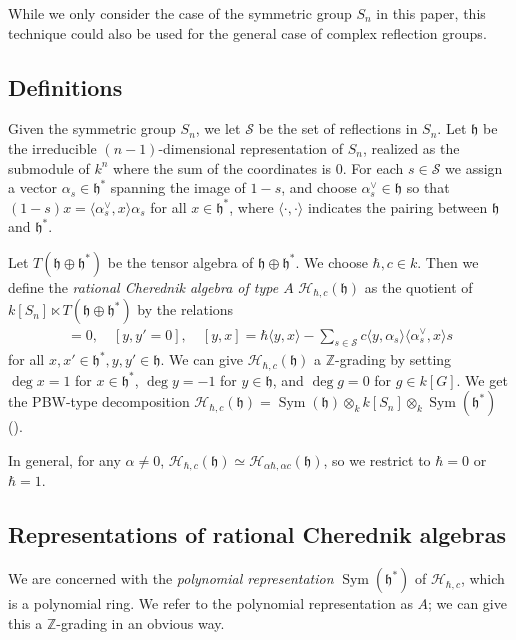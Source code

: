 \documentclass{amsart}
\numberwithin{equation}{section}
\theoremstyle{definition}
\newcommand{\h}{\mathfrak{h}}
\newcommand{\HH}{\mathcal{H}}
\newcommand{\Sym}{\operatorname{Sym}}
\begin{document}
While we only consider the case of the symmetric group $S_n$ in this paper, this technique could also be used for the general case of complex reflection groups. %


\subsection{Definitions}

Given the symmetric group $S_n$, we let $\mathcal{S}$ be the set of reflections in $S_n$. Let $\h$ be the irreducible $(n-1)$-dimensional representation of $S_n$, realized as the submodule of $k^n$ where the sum of the coordinates is $0$. For each $s \in \mathcal{S}$ we assign a vector $\alpha_s \in \h^*$ spanning the image of $1-s$, and choose $\alpha_s^\vee \in \h$ so that $(1-s)x=\langle \alpha_s^\vee,x\rangle \alpha_s$ for all $x \in \h^*$, where $\langle \cdot,\cdot\rangle$ indicates the pairing between $\h$ and $\h^*$. 

Let $T(\h \oplus \h^*)$ be the tensor algebra of $\h \oplus \h^*$. We choose $\hbar,c \in k$. Then we define the {\it rational Cherednik algebra of type $A$} $\HH_{\hbar,c}(\h)$ as the quotient of $k[S_n] \ltimes T(\h \oplus \h^*)$ by the relations
\begin{align*}
[x,x']=0, \quad [y,y' = 0], \quad [y,x] = \hbar\langle y,x\rangle - \sum_{s \in \mathcal{S}} c\langle y,\alpha_s\rangle\langle \alpha_s^\vee,x\rangle s
\end{align*}
 for all $x,x' \in \h^*, y,y' \in \h$. We can give $\HH_{\hbar,c}(\h)$ a $\mathbb{Z}$-grading by setting $\deg x=1$ for $x \in \h^*$, $\deg y = -1$ for $y \in \h$, and $\deg g=0$ for $g \in k[G]$. We get the PBW-type decomposition $\HH_{\hbar,c}(\h)=\Sym(\h) \otimes_k k[S_n] \otimes_k \Sym(\h^*)$ (\cite[Section 3.2]{EM}). 

In general, for any $\alpha \ne 0$, $\HH_{\hbar,c}(\h)\simeq \HH_{\alpha\hbar,\alpha c}(\h)$, so we restrict to $\hbar=0$ or $\hbar = 1$. 

\subsection{Representations of rational Cherednik algebras}

We are concerned with the {\it polynomial representation} $\Sym(\h^*)$ of $\HH_{\hbar,c}$, which is a polynomial ring. We refer to the polynomial representation as $A$; we can give this a $\mathbb{Z}$-grading in an obvious way. 
\end{document}
